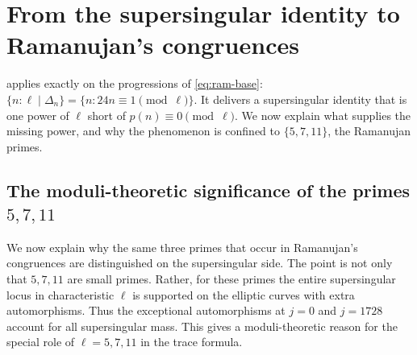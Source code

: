 \documentclass[12pt]{amsart}
\theoremstyle{definition}
\theoremstyle{remark}
\begin{document}
\section{From the supersingular identity to Ramanujan's congruences}\label{sec:partII}

 applies exactly on the progressions of
\eqref{eq:ram-base}: $\{n:\ell\mid\Delta_n\}=\{n:24n\equiv1\pmod\ell\}$. It delivers a
supersingular identity that is one power of $\ell$ short of $p(n)\equiv0\pmod\ell$. We now
explain what supplies the missing power, and why the phenomenon is confined to
$\{5,7,11\}$, the Ramanujan primes.

\subsection{The moduli-theoretic significance of the primes $5,7,11$}

We now explain why the same three primes that occur in Ramanujan's
congruences are distinguished on the supersingular side.  The point is
not only that $5,7,11$ are small primes.  Rather, for these primes the
entire supersingular locus in characteristic $\ell$ is supported on
the elliptic curves with extra automorphisms.  Thus the exceptional
automorphisms at $j=0$ and $j=1728$ account for all supersingular mass.
This gives a moduli-theoretic reason for the special role of
$\ell=5,7,11$ in the trace formula.
\end{document}
